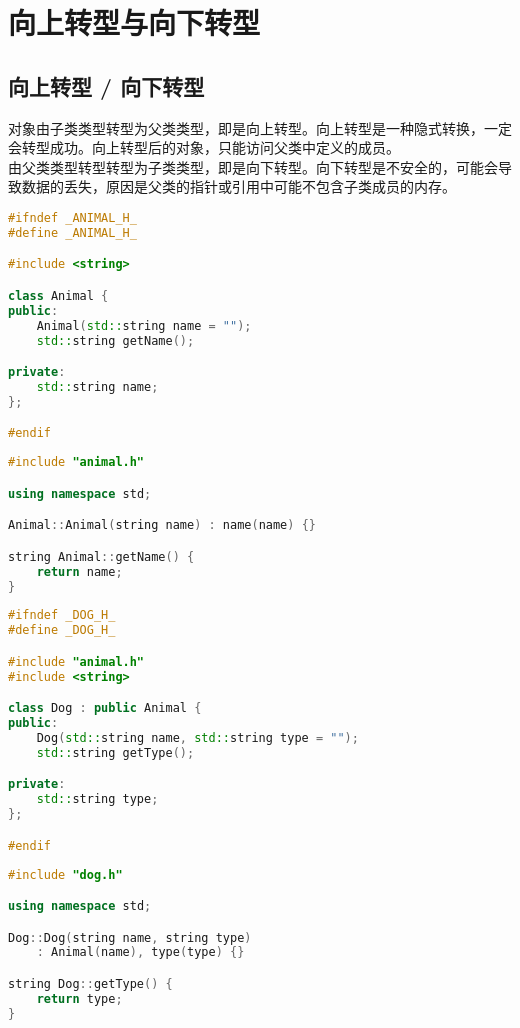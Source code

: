\newpage

\section{向上转型与向下转型}

\subsection{向上转型 / 向下转型}

对象由子类类型转型为父类类型，即是向上转型。向上转型是一种隐式转换，一定会转型成功。向上转型后的对象，只能访问父类中定义的成员。 \\

由父类类型转型转型为子类类型，即是向下转型。向下转型是不安全的，可能会导致数据的丢失，原因是父类的指针或引用中可能不包含子类成员的内存。 \\


\begin{lstlisting}[language=C++, title=animal.h]
#ifndef _ANIMAL_H_
#define _ANIMAL_H_

#include <string>

class Animal {
public:
    Animal(std::string name = "");
    std::string getName();

private:
    std::string name;
};

#endif
\end{lstlisting}

\begin{lstlisting}[language=C++, title=animal.cpp]
#include "animal.h"

using namespace std;

Animal::Animal(string name) : name(name) {}

string Animal::getName() {
    return name;
}
\end{lstlisting}

\begin{lstlisting}[language=C++, title=dog.h]
#ifndef _DOG_H_
#define _DOG_H_

#include "animal.h"
#include <string>

class Dog : public Animal {
public:
    Dog(std::string name, std::string type = "");
    std::string getType();

private:
    std::string type;
};

#endif
\end{lstlisting}

\begin{lstlisting}[language=C++, title=dog.cpp]
#include "dog.h"

using namespace std;

Dog::Dog(string name, string type) 
    : Animal(name), type(type) {}

string Dog::getType() {
    return type;
}
\end{lstlisting}

